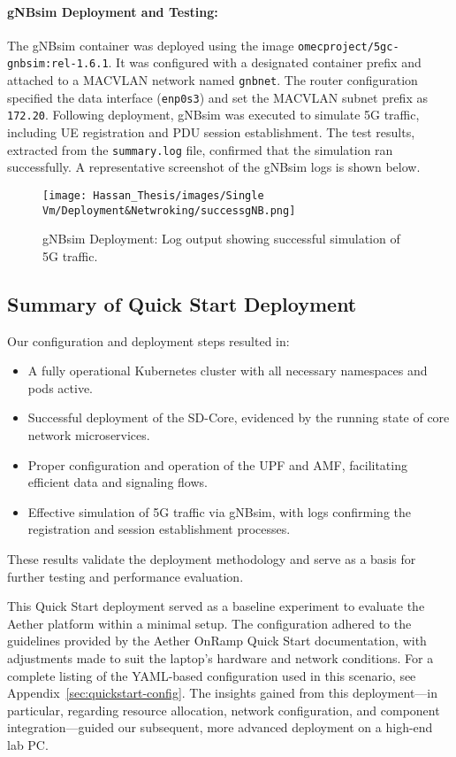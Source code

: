 \paragraph{gNBsim Deployment and Testing:}  
The gNBsim container was deployed using the image \texttt{omecproject/5gc-gnbsim:rel-1.6.1}. It was configured with a designated container prefix and attached to a MACVLAN network named \texttt{gnbnet}. The router configuration specified the data interface (\texttt{enp0s3}) and set the MACVLAN subnet prefix as \texttt{172.20}. Following deployment, gNBsim was executed to simulate 5G traffic, including UE registration and PDU session establishment. The test results, extracted from the \texttt{summary.log} file, confirmed that the simulation ran successfully. A representative screenshot of the gNBsim logs is shown below.

\begin{figure}[H]
    \centering
    \texttt{[image: Hassan\_Thesis/images/Single Vm/Deployment\&Netwroking/successgNB.png]}
    \caption{gNBsim Deployment: Log output showing successful simulation of 5G traffic.}
    \label{fig:gnbsim_status}
\end{figure}

\subsection{Summary of Quick Start Deployment}
\label{subsec:qs-summary}

Our configuration and deployment steps resulted in:
\begin{itemize}
    \item A fully operational Kubernetes cluster with all necessary namespaces and pods active.
    \item Successful deployment of the SD-Core, evidenced by the running state of core network microservices.
    \item Proper configuration and operation of the UPF and AMF, facilitating efficient data and signaling flows.
    \item Effective simulation of 5G traffic via gNBsim, with logs confirming the registration and session establishment processes.
\end{itemize}

These results validate the deployment methodology and serve as a basis for further testing and performance evaluation.

This Quick Start deployment served as a baseline experiment to evaluate the Aether 
platform within a minimal setup. The configuration adhered to the guidelines provided 
by the Aether OnRamp Quick Start documentation, with adjustments made to suit the 
laptop's hardware and network conditions. For a complete listing of the YAML-based 
configuration used in this scenario, see Appendix~\ref{sec:quickstart-config}. The 
insights gained from this deployment---in particular, regarding resource allocation, 
network configuration, and component integration---guided our subsequent, more 
advanced deployment on a high-end lab PC.

